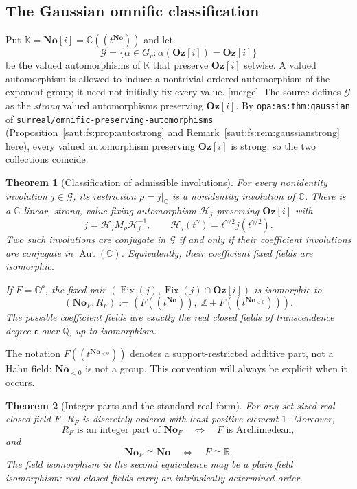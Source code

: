 \documentclass[11pt]{article}
\newtheorem{theorem}{Theorem}[section]
\theoremstyle{definition}
\theoremstyle{remark}
\newcommand{\No}{\mathbf{No}}
\newcommand{\R}{\mathbb R}
\newcommand{\C}{\mathbb C}
\newcommand{\Q}{\mathbb Q}
\newcommand{\Z}{\mathbb Z}
\newcommand{\K}{\mathbb K}
\newcommand{\Aut}{\operatorname{Aut}}
\newcommand{\Fix}{\operatorname{Fix}}
\newcommand{\repo}[1]{\nolinkurl{#1}}%
\newcommand{\lbl}[1]{\nolinkurl{#1}}%
\newcommand{\Oz}{\mathbf{Oz}}
\newcommand{\cc}{\mathfrak c}
\newcommand{\mergetag}{\textup{[merge]}}
\numberwithin{equation}{section}
\begin{document}
\subsection{The Gaussian omnific classification}

Put $\K=\No[i]=\C((t^{\No}))$ and let
\[
 \mathcal G=\{\alpha\in G_v:\alpha(\Oz[i])=\Oz[i]\}
\]
be the valued automorphisms of $\K$ that preserve $\Oz[i]$ setwise. A valued
automorphism is allowed to induce a nontrivial ordered automorphism of the exponent
group; it need not initially fix every value. \mergetag\ The source defines $\mathcal G$
as the \emph{strong} valued automorphisms preserving $\Oz[i]$. By
\lbl{opa:as:thm:gaussian} of \repo{surreal/omnific-preserving-automorphisms}
(Proposition~\ref{saut:fs:prop:autostrong} and Remark~\ref{saut:fs:rem:gaussianstrong}
here), every valued automorphism preserving $\Oz[i]$ is strong, so the two
collections coincide.

\begin{theorem}[Classification of admissible involutions]\label{saut:fs:thm:main-involutions}
For every nonidentity involution $j\in\mathcal G$, its restriction $\rho=j|_\C$ is a
nonidentity involution of $\C$. There is a $\C$-linear, strong, value-fixing
automorphism $\mathcal H_j$ preserving $\Oz[i]$ with
\[
 j=\mathcal H_jM_\rho\mathcal H_j^{-1},\qquad
 \mathcal H_j(t^\gamma)=t^{\gamma/2}j(t^{\gamma/2}).
\]
Two such involutions are conjugate in $\mathcal G$ if and only if their coefficient
involutions are conjugate in $\Aut(\C)$. Equivalently, their coefficient fixed
fields are isomorphic.

If $F=\C^\rho$, the fixed pair $(\Fix(j),\Fix(j)\cap\Oz[i])$ is isomorphic to
\begin{equation}\label{saut:fs:eq:main-fixed-pair}
 (\No_F,R_F):=\left(F((t^{\No})),\;\Z+F((t^{\No_{<0}}))\right).
\end{equation}
The possible coefficient fields are exactly the real closed fields of
transcendence degree $\cc$ over $\Q$, up to isomorphism.
\end{theorem}

The notation $F((t^{\No_{<0}}))$ denotes a support-restricted additive part, not a
Hahn field: $\No_{<0}$ is not a group. This convention will always be explicit when
it occurs.

\begin{theorem}[Integer parts and the standard real form]\label{saut:fs:thm:main-ip}
For any set-sized real closed field $F$, $R_F$ is discretely ordered with least
positive element $1$. Moreover,
\[
 R_F\text{ is an integer part of }\No_F
 \quad\Longleftrightarrow\quad F\text{ is Archimedean},
\]
and
\[
 \No_F\cong\No
 \quad\Longleftrightarrow\quad F\cong\R.
\]
The field isomorphism in the second equivalence may be a plain field
isomorphism: real closed fields carry an intrinsically determined order.
\end{theorem}
\end{document}
